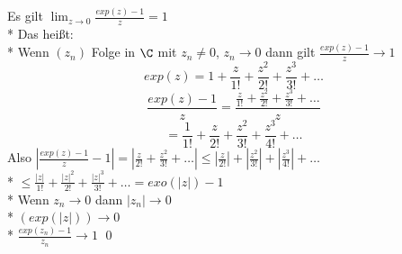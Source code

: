 Es gilt $\lim_{z \to 0} \frac{exp(z) - 1}{z} = 1$\\*
Das heißt: \\*
Wenn $(z_n)$ Folge in $\C$ mit $z_n \neq 0$, $z_n \to 0$ dann gilt $\frac{exp(z) -1}{z} \to 1$
\bew
$$exp(z) = 1 + \frac{z}{1!} + \frac{z^2}{2!} + \frac{z^3}{3!} + \ldots$$
$$\frac{exp(z) - 1}{z} =\frac{\frac{z}{1!} + \frac{z^2}{2!} + \frac{z^3}{3!} + \ldots}{z}$$
$$= \frac{1}{1!} + \frac{z}{2!} + \frac{z^2}{3!} + \frac{z^3}{4!} + \ldots$$
Also $|\frac{exp(z) - 1}{z} - 1| = |\frac{z}{2!} + \frac{z^2}{3!} + \ldots| \leq |\frac{z}{2!}| + |\frac{z^2}{3!}| + |\frac{z^3}{4!}| + \ldots$\\*
$\leq \frac{|z|}{1!} + \frac{|z|^2}{2!} + \frac{|z|^3}{3!} + \ldots = exo(|z|) -1$\\*
Wenn $z_n \to 0$ dann $|z_n| \to 0$\\*
\Rarr{} $(exp(|z|)) \to 0$\\*
\Rarr{} $\frac{exp(z_n) - 1}{z_n} \to 1$ \qed

